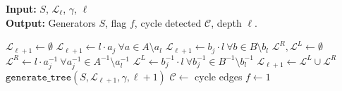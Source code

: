 \documentclass[a4paper,twocolumn,11pt,accepted=2026-05-03]{quantumarticle}
\newcommand{\setc}{\mathcal{C}}
\begin{document}
\begin{algorithm}
    \caption{$\mathtt{generate\_tree}$}
    \label{alg:generate_tree}
    \textbf{Input:} $S$, $\mathcal{L}_{\ell}$, $\gamma$, $\ell$\\
    \textbf{Output:} Generators $S$, flag $f$, cycle detected $\setc$, depth $\ell$.
\begin{algorithmic}[1]
        \State $\mathcal{L}_{\ell+1} \gets \emptyset$
                \State $\mathcal{L}_{\ell+1} \gets l \cdot a_j\ \forall a \in A \setminus a_l$ 
                \State $\mathcal{L}_{\ell+1} \gets b_j \cdot l\ \forall b \in B \setminus b_l$
            \Else
                \State $\mathcal{L}^R, \mathcal{L}^L \gets \emptyset$
                \State $\mathcal{L}^R \gets l \cdot a_j^{-1}\ \forall a_j^{-1} \in A^{-1} \setminus a_l^{-1}$
                \State $\mathcal{L}^L \gets b_j^{-1} \cdot l\ \forall b_j^{-1} \in B^{-1} \setminus b_l^{-1}$
                \State $\mathcal{L}_{\ell+1} \gets \mathcal{L}^L \cup \mathcal{L}^R$
            \EndIf
        \EndFor
            \State \Return 
        \EndIf
            \State $\mathtt{generate\_tree}(S, \mathcal{L}_{\ell+1}, \gamma, \ell+1)$
        \Else
            \State $\setc \gets $ cycle edges
            \State $f \gets 1$
        \EndIf
        \State \Return
    \end{algorithmic}

\end{algorithm}
\end{document}
